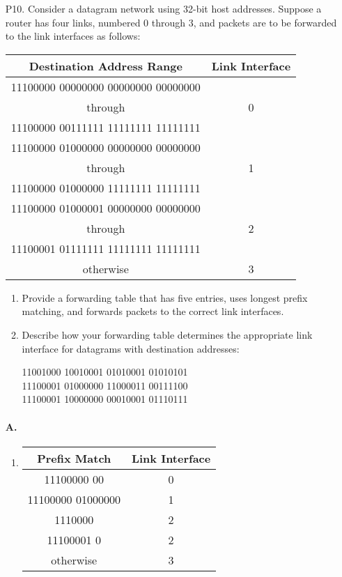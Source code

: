 \documentclass[]{article}
\begin{document}
	\begin{enumerate}
		\item[P10.] 
		Consider a datagram network using 32-bit host addresses. Suppose a router has four links, numbered 0 through 3, and packets are to be forwarded to the link interfaces as follows:
		\begin{table}[H]
			\centering
			\begin{tabular}{|c|c|}
				\hline
				Destination Address Range & Link Interface \\\hline
				11100000 00000000 00000000 00000000 & ~ \\
				through & 0 \\
				11100000 00111111 11111111 11111111 & ~ \\\hline
				11100000 01000000 00000000 00000000 & ~ \\
				through & 1 \\
				11100000 01000000 11111111 11111111 & ~ \\\hline
				11100000 01000001 00000000 00000000 & ~ \\
				through & 2 \\
				11100001 01111111 11111111 11111111 & ~ \\\hline
				otherwise & 3 \\\hline
			\end{tabular}
		\end{table}
		\begin{enumerate}
			\item Provide a forwarding table that has five entries, uses longest prefix matching, and forwards packets to the correct link interfaces.
			\item Describe how your forwarding table determines the appropriate link interface for datagrams with destination addresses:
			\begin{center}
				11001000 10010001 01010001 01010101\\
				11100001 01000000 11000011 00111100\\
				11100001 10000000 00010001 01110111
			\end{center}
		\end{enumerate}
		\paragraph{A.}
		\begin{enumerate}
			\item
			\begin{table}[H]
				\centering
				\begin{tabular}{|c|c|}
					\hline
					Prefix Match & Link Interface \\\hline
					11100000 00 & 0 \\\hline
					11100000 01000000  & 1 \\\hline
					1110000 & 2 \\\hline
					11100001 0 & 2 \\\hline
					otherwise & 3 \\\hline
				\end{tabular}
			\end{table}
			

\end{enumerate}
\end{enumerate}
\end{document}
